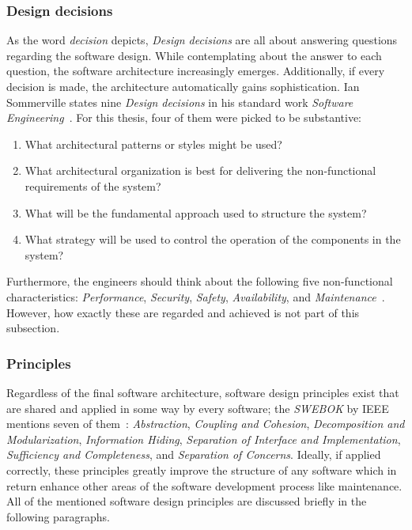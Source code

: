 \documentclass[12pt,a4paper,twoside]{report}
\begin{document}
\subsubsection{Design decisions}

As the word \textit{decision} depicts, \textit{Design decisions} are all about
answering questions regarding the software design. While contemplating about
the answer to each question, the software architecture increasingly emerges.
Additionally, if every decision is made, the architecture automatically gains
sophistication. Ian Sommerville states nine \textit{Design decisions} in his
standard work \textit{Software Engineering}~\cite{sommerville-se}.
For this thesis, four of them were picked to be substantive:
\begin{enumerate}
\item What architectural patterns or styles might be used?
\item What architectural organization is best for delivering the non-functional requirements of the system?
\item What will be the fundamental approach used to structure the system?
\item What strategy will be used to control the operation of the components in the system?
\end{enumerate}
Furthermore, the engineers should think about the following five non-functional characteristics:
\textit{Performance}, \textit{Security}, \textit{Safety}, \textit{Availability},
and \textit{Maintenance}~\cite{sommerville-se}. However, how exactly these are
regarded and achieved is not part of this subsection.


\subsubsection{Principles}

Regardless of the final software architecture, software design principles exist
that are shared and applied in some way by every software; the \textit{SWEBOK} by IEEE
mentions seven of them~\cite{swebok}: \textit{Abstraction}, \textit{Coupling and Cohesion},
\textit{Decomposition and Modularization}, \textit{Information Hiding},
\textit{Separation of Interface and Implementation},
\textit{Sufficiency and Completeness}, and \textit{Separation of Concerns}.
Ideally, if applied correctly, these principles greatly improve the structure
of any software which in return enhance other areas of the
software development process like maintenance. All of the mentioned
software design principles are discussed briefly in the following paragraphs.
\end{document}
